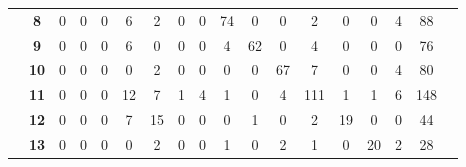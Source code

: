 \begin{table}[!ht]
\begin{tabular}{lccccccccccccccccl}
 & \multicolumn{1}{c|}{\textbf{8}} & \multicolumn{1}{c|}{0} & \multicolumn{1}{c|}{0} & \multicolumn{1}{c|}{0} & \multicolumn{1}{c|}{6} & \multicolumn{1}{c|}{2} & \multicolumn{1}{c|}{0} & \multicolumn{1}{c|}{0} & \multicolumn{1}{c|}{74} & \multicolumn{1}{c|}{0} & \multicolumn{1}{c|}{0} & \multicolumn{1}{c|}{2} & \multicolumn{1}{c|}{0} & \multicolumn{1}{c|}{0} & \multicolumn{1}{c|}{4} & 88 &  \\ \cline{3-16}
 & \multicolumn{1}{c|}{\textbf{9}} & \multicolumn{1}{c|}{0} & \multicolumn{1}{c|}{0} & \multicolumn{1}{c|}{0} & \multicolumn{1}{c|}{6} & \multicolumn{1}{c|}{0} & \multicolumn{1}{c|}{0} & \multicolumn{1}{c|}{0} & \multicolumn{1}{c|}{4} & \multicolumn{1}{c|}{62} & \multicolumn{1}{c|}{0} & \multicolumn{1}{c|}{4} & \multicolumn{1}{c|}{0} & \multicolumn{1}{c|}{0} & \multicolumn{1}{c|}{0} & 76 &  \\ \cline{3-16}
 & \multicolumn{1}{c|}{\textbf{10}} & \multicolumn{1}{c|}{0} & \multicolumn{1}{c|}{0} & \multicolumn{1}{c|}{0} & \multicolumn{1}{c|}{0} & \multicolumn{1}{c|}{2} & \multicolumn{1}{c|}{0} & \multicolumn{1}{c|}{0} & \multicolumn{1}{c|}{0} & \multicolumn{1}{c|}{0} & \multicolumn{1}{c|}{67} & \multicolumn{1}{c|}{7} & \multicolumn{1}{c|}{0} & \multicolumn{1}{c|}{0} & \multicolumn{1}{c|}{4} & 80 &  \\ \cline{3-16}
 & \multicolumn{1}{c|}{\textbf{11}} & \multicolumn{1}{c|}{0} & \multicolumn{1}{c|}{0} & \multicolumn{1}{c|}{0} & \multicolumn{1}{c|}{12} & \multicolumn{1}{c|}{7} & \multicolumn{1}{c|}{1} & \multicolumn{1}{c|}{4} & \multicolumn{1}{c|}{1} & \multicolumn{1}{c|}{0} & \multicolumn{1}{c|}{4} & \multicolumn{1}{c|}{111} & \multicolumn{1}{c|}{1} & \multicolumn{1}{c|}{1} & \multicolumn{1}{c|}{6} & 148 &  \\ \cline{3-16}
 & \multicolumn{1}{c|}{\textbf{12}} & \multicolumn{1}{c|}{0} & \multicolumn{1}{c|}{0} & \multicolumn{1}{c|}{0} & \multicolumn{1}{c|}{7} & \multicolumn{1}{c|}{15} & \multicolumn{1}{c|}{0} & \multicolumn{1}{c|}{0} & \multicolumn{1}{c|}{0} & \multicolumn{1}{c|}{1} & \multicolumn{1}{c|}{0} & \multicolumn{1}{c|}{2} & \multicolumn{1}{c|}{19} & \multicolumn{1}{c|}{0} & \multicolumn{1}{c|}{0} & 44 &  \\ \cline{3-16}
 & \multicolumn{1}{c|}{\textbf{13}} & \multicolumn{1}{c|}{0} & \multicolumn{1}{c|}{0} & \multicolumn{1}{c|}{0} & \multicolumn{1}{c|}{0} & \multicolumn{1}{c|}{2} & \multicolumn{1}{c|}{0} & \multicolumn{1}{c|}{0} & \multicolumn{1}{c|}{1} & \multicolumn{1}{c|}{0} & \multicolumn{1}{c|}{2} & \multicolumn{1}{c|}{1} & \multicolumn{1}{c|}{0} & \multicolumn{1}{c|}{20} & \multicolumn{1}{c|}{2} & 28 &  \\ \cline{3-16}

\end{tabular}
\end{table}
